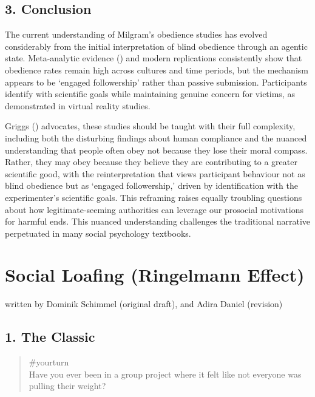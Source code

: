 \documentclass[
  letterpaper,
]{book}
\begin{document}
\section{3. Conclusion}\label{conclusion-7}

The current understanding of Milgram's obedience studies has evolved
considerably from the initial interpretation of blind obedience through
an agentic state. Meta-analytic evidence
() and
modern replications consistently show that obedience rates remain high
across cultures and time periods, but the mechanism appears to be
`engaged followership' rather than passive submission. Participants
identify with scientific goals while maintaining genuine concern for
victims, as demonstrated in virtual reality studies.

Griggs () advocates, these
studies should be taught with their full complexity, including both the
disturbing findings about human compliance and the nuanced understanding
that people often obey not because they lose their moral compass.
Rather, they may obey because they believe they are contributing to a
greater scientific good, with the reinterpretation that views
participant behaviour not as blind obedience but as `engaged
followership,' driven by identification with the experimenter's
scientific goals. This reframing raises equally troubling questions
about how legitimate-seeming authorities can leverage our prosocial
motivations for harmful ends. This nuanced understanding challenges the
traditional narrative perpetuated in many social psychology textbooks.


\chapter{\texorpdfstring{{Social Loafing (Ringelmann
Effect)}}{Social Loafing (Ringelmann Effect)}}\label{social-loafing-ringelmann-effect}

{written by Dominik Schimmel (original draft), and Adira Daniel
(revision)}

\section{1. The Classic}\label{the-classic-8}

\begin{quote}
{\#yourturn}\\
Have you ever been in a group project where it felt like not everyone
was pulling their weight?
\end{quote}
\end{document}
